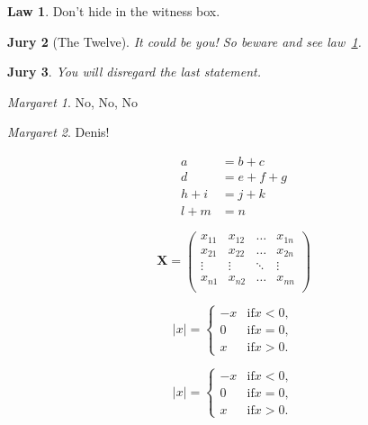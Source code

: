 \documentclass[]{ctexart}
\begin{document}
	\theoremstyle{definition} \newtheorem{law}{Law}
	\theoremstyle{plain} \newtheorem{jury}[law]{Jury}
	\theoremstyle{remark} \newtheorem*{mar}{Margaret}

	\begin{law}
		\label{law:box}
		Don't hide in the witness box.
	\end{law}
	\begin{jury}[The Twelve]
		It could be you! So beware and
		see law~\ref{law:box}.
	\end{jury}
	\begin{jury}
		You will disregard the last
		statement.
	\end{jury}
	\begin{mar}
		No, No, No
	\end{mar}
	\begin{mar}
		Denis!
	\end{mar}


	\begin{equation}
		\begin{aligned}
			a &= b + c \\
			d &= e + f + g \\
			h + i &= j + k \\
			l + m &= n
		\end{aligned}
	\end{equation}

	\[\mathbf{X} = \left(
	\begin{array}{cccc}
		x_{11} & x_{12} & \ldots & x_{1n} \\
		x_{21} & x_{22} & \ldots & x_{2n} \\
		\vdots & \vdots & \ddots & \vdots \\
		x_{n1} & x_{n2} & \ldots & x_{nn} \\
	\end{array} \right)\]

	\[ |x| = \left\{
	\begin{array}{rl}
		-x & \text{if} x < 0, \\
		0  & \text{if} x = 0, \\
		x  & \text{if} x > 0.
	\end{array} \right. \]

	\[ |x| =
	\begin{cases}
		-x & \text{if} x < 0,\\
		0 & \text{if} x = 0,\\
		x & \text{if} x > 0.
	\end{cases} \]
\end{document}
